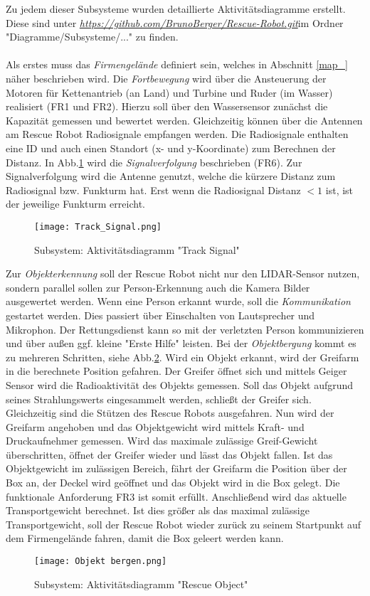 Zu jedem dieser Subsysteme wurden detaillierte Aktivitätsdiagramme erstellt. Diese sind unter \textit{\url{https://github.com/BrunoBerger/Rescue-Robot.git}}im Ordner "Diagramme/Subsysteme/..." zu finden.\\ 
\\
Als erstes muss das \textit{Firmengelände} definiert sein, welches in Abschnitt \ref{map_} näher beschrieben wird. Die \textit{Fortbewegung} wird über die Ansteuerung der Motoren für Kettenantrieb (an Land) und Turbine und Ruder (im Wasser) realisiert (FR1 und FR2). Hierzu soll über den Wassersensor zunächst die Kapazität gemessen und bewertet werden. Gleichzeitig können über die Antennen am Rescue Robot Radiosignale empfangen werden. Die Radiosignale enthalten eine ID und auch einen Standort (x- und y-Koordinate) zum Berechnen der Distanz. In Abb.\ref{Track_Signal} wird die \textit{Signalverfolgung} beschrieben (FR6). Zur Signalverfolgung wird die Antenne genutzt, welche die kürzere Distanz zum Radiosignal bzw. Funkturm hat. Erst wenn die Radiosignal Distanz $<1$ ist, ist der jeweilige Funkturm erreicht.

\begin{figure}[H]
  \centering\texttt{[image: Track\_Signal.png]}
  \caption{Subsystem: Aktivitätsdiagramm "Track Signal"}
  \label{Track_Signal}
\end{figure}

Zur \textit{Objekterkennung} soll der Rescue Robot nicht nur den LIDAR-Sensor nutzen, sondern parallel sollen zur Person-Erkennung auch die Kamera Bilder ausgewertet werden. Wenn eine Person erkannt wurde, soll die \textit{Kommunikation} gestartet werden. Dies passiert über Einschalten von Lautsprecher und Mikrophon. Der Rettungsdienst kann so mit der verletzten Person kommunizieren und über außen ggf. kleine "Erste Hilfe" leisten. Bei der \textit{Objektbergung} kommt es zu mehreren Schritten, siehe Abb.\ref{Rescue_object}. Wird ein Objekt erkannt, wird der Greifarm in die berechnete Position gefahren. Der Greifer öffnet sich und mittels Geiger Sensor wird die Radioaktivität des Objekts gemessen. Soll das Objekt aufgrund seines Strahlungswerts eingesammelt werden, schließt der Greifer sich. Gleichzeitig sind die Stützen des Rescue Robots ausgefahren. Nun wird der Greifarm angehoben und das Objektgewicht wird mittels Kraft- und Druckaufnehmer gemessen. Wird das maximale zulässige  Greif-Gewicht überschritten, öffnet der Greifer wieder und lässt das Objekt fallen. Ist das Objektgewicht im zulässigen Bereich, fährt der Greifarm die Position über der Box an, der Deckel wird geöffnet und das Objekt wird in die Box gelegt. Die funktionale Anforderung FR3 ist somit erfüllt. Anschließend wird das aktuelle Transportgewicht berechnet. Ist dies größer als das maximal zulässige Transportgewicht, soll der Rescue Robot wieder zurück zu seinem Startpunkt auf dem Firmengelände fahren, damit die Box geleert werden kann.

\begin{figure}[H]
  \centering\texttt{[image: Objekt bergen.png]}
  \caption{Subsystem: Aktivitätsdiagramm "Rescue Object"}
  \label{Rescue_object}
\end{figure}